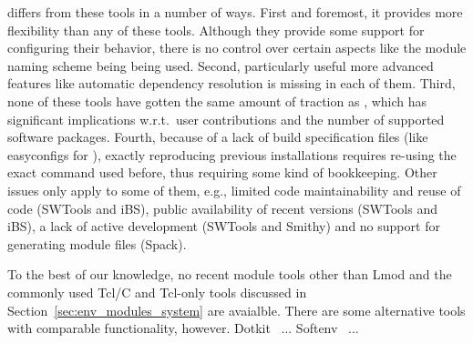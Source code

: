\easybuild{} differs from these tools in a number of ways. First and foremost, it
provides more flexibility than any of these tools. Although they provide some support
for configuring their behavior, there is no control over certain aspects like the
module naming scheme being being used. Second, particularly useful more advanced
features like automatic dependency resolution is missing in each of them. Third, none
of these tools have gotten the same amount of traction as \easybuild{}, which has
significant implications w.r.t.\ user contributions and the number of supported
software packages. Fourth, because of a lack of build specification files (like
easyconfigs for \easybuild{}), exactly reproducing previous installations requires
re-using the exact command used before, thus requiring some kind of bookkeeping.
Other issues only apply to some of them, e.g., limited code
maintainability and reuse of code (SWTools and iBS), public availability of recent
versions (SWTools and iBS), a lack of active development (SWTools and Smithy) and
no support for generating module files (Spack).

To the best of our knowledge, no recent module tools other than Lmod and the commonly
used Tcl/C and Tcl-only tools discussed in Section~\ref{sec:env_modules_system} are
avaialble. There are some alternative tools with comparable functionality, however.
Dotkit~\cite{dotkit} ...
Softenv~\cite{softenv} ...
